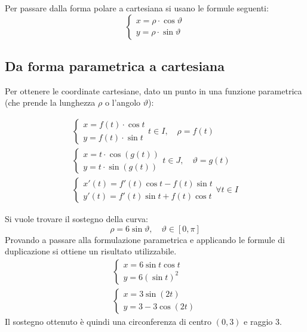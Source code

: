 Per passare dalla forma polare a cartesiana si usano le formule seguenti:
\begin{equation}
	\begin{cases}
		x=\rho\cdot \cos \vartheta \\
		y=\rho\cdot \sin \vartheta
	\end{cases} 
\end{equation}

\subsection{Da forma parametrica a cartesiana}
Per ottenere le coordinate cartesiane, dato un punto in una funzione parametrica (che prende la lunghezza $\rho$ o l'angolo $\vartheta$): 

\begin{gather}
	\begin{cases}
		x=f(t)\cdot \cos t \\
		y=f(t)\cdot \sin t
	\end{cases} t\in I, \quad \rho=f(t) \label{polar-param-1}\\
	\begin{cases}
		x=t\cdot \cos(g(t)) \\
		y=t\cdot \sin(g(t))
	\end{cases} t\in J, \quad \vartheta=g(t) \label{polar-param-2} \\
	\begin{cases}
		x'(t)=f'(t)\cos t-f(t)\sin t \\
		y'(t)=f'(t)\sin t+f(t)\cos t
	\end{cases} \forall t\in I
\end{gather}

\begin{example}
Si vuole trovare il sostegno della curva:
\[
	\rho=6\sin\vartheta,\quad \vartheta\in [0, \pi]
\]
Provando a passare alla formulazione parametrica e applicando le formule di duplicazione si ottiene un risultato utilizzabile.
\begin{gather*}
	\begin{cases}
	x=6\sin t\cos t\\
	y=6(\sin t)^2 \end{cases} \\
	\begin{cases}
		x=3\sin(2t) \\
		y=3-3\cos(2t)
	\end{cases}
\end{gather*}
Il sostegno ottenuto è quindi una circonferenza di centro $(0, 3)$ e raggio $3$. 
\end{example}

